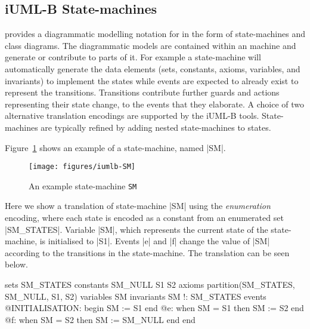 
\subsection{iUML-B State-machines}
\label{sec:iumlb}

\iUMLB provides a diagrammatic modelling notation for \EventB in the form of state-machines and class diagrams. The diagrammatic models are contained within an \EventB machine and generate or contribute to parts of it. For example a state-machine will automatically generate the \EventB data elements (sets, constants, axioms, variables, and invariants) to implement the states while \EventB events are expected to already exist to represent the transitions. Transitions contribute further guards and actions representing their state change, to the events that they elaborate. A choice of two alternative translation encodings are supported by the iUML-B tools.  State-machines are typically refined by adding nested state-machines to states.

Figure~\ref{fig:iumlb-sm} shows an example of a state-machine, named |SM|.
\begin{figure}[!htbp]
	\centering
	\texttt{[image: figures/iumlb-SM]}
	\caption{An example \iUMLB state-machine \texttt{SM}}
	\label{fig:iumlb-sm}
\end{figure}
Here we show a translation of state-machine |SM| using the \emph{enumeration} encoding, where each state is encoded as a constant from an enumerated set |SM_STATES|.  Variable |SM|, which represents the current state of the state-machine, is initialised to |S1|. Events |e| and |f| change the value of |SM| according to the transitions in the state-machine.  The \EventB translation can be seen below.
\begin{EventBcode}
sets SM_STATES
constants SM_NULL S1 S2
axioms
    partition(SM_STATES, {SM_NULL}, {S1}, {S2})
variables SM
invariants SM !: SM_STATES
events
    @INITIALISATION: begin SM := S1 end
    @e: when SM = S1 then SM := S2 end
    @f: when SM = S2 then SM := SM_NULL end
end
\end{EventBcode}

